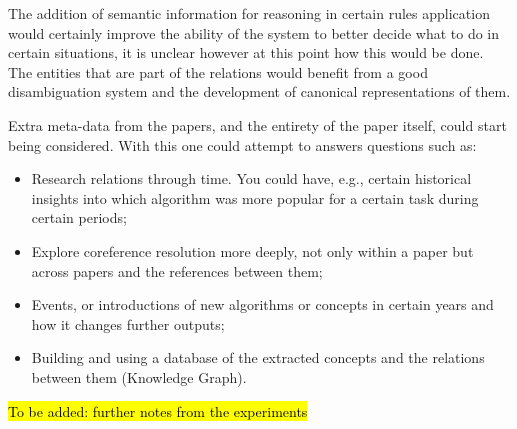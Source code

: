 \documentclass[11pt,a4paper,openright]{memoir}
\begin{document}
The addition of semantic information for reasoning in certain rules application would certainly improve the ability of the system to better decide what to do in certain situations, it is unclear however at this point how this would be done. The entities that are part of the relations would benefit from a good disambiguation system and the development of canonical representations of them.

Extra meta-data from the papers, and the entirety of the paper itself, could start being considered. With this one could attempt to answers questions such as:
	\begin{itemize}
	  \item Research relations through time. You could have, e.g., certain historical insights into which algorithm was more popular for a certain task during certain periods;
	  \item Explore coreference resolution more deeply, not only within a paper but across papers and the references between them;
	  \item Events, or introductions of new algorithms or concepts in certain years and how it changes further outputs;
	  \item Building and using a database of the extracted concepts and the relations between them (Knowledge Graph).
	\end{itemize}

\hl{To be added: further notes from the experiments}

\backmatter

\printbibliography

\appendix
\end{document}
